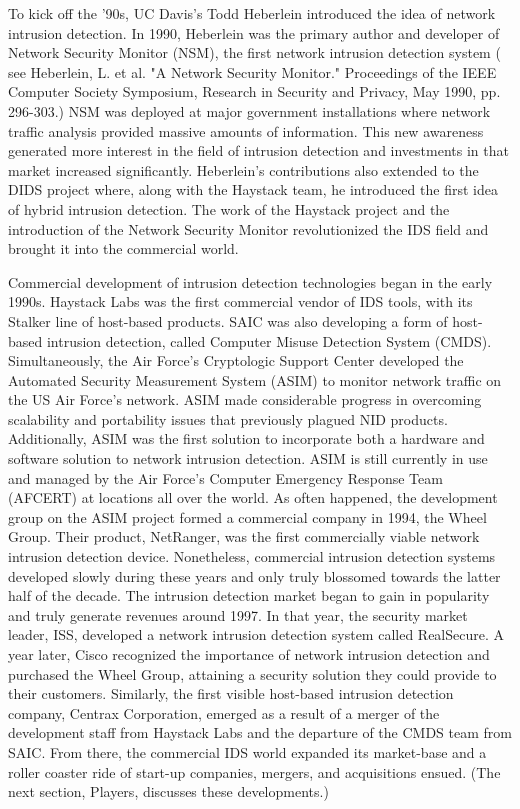 \documentclass[thesis=M,english]{FITthesis}[2011/07/15]
\begin{document}
To kick off the '90s, UC Davis's Todd Heberlein introduced the idea of network intrusion detection. In 1990, Heberlein was the primary author and developer of Network Security Monitor (NSM), the first network intrusion detection system ( see Heberlein, L. et al. "A Network Security Monitor." Proceedings of the IEEE Computer Society Symposium, Research in Security and Privacy, May 1990, pp. 296-303.) NSM was deployed at major government installations where network traffic analysis provided massive amounts of information. This new awareness generated more interest in the field of intrusion detection and investments in that market increased significantly. Heberlein's contributions also extended to the DIDS project where, along with the Haystack team, he introduced the first idea of hybrid intrusion detection. The work of the Haystack project and the introduction of the Network Security Monitor revolutionized the IDS field and brought it into the commercial world.

Commercial development of intrusion detection technologies began in the early 1990s. Haystack Labs was the first commercial vendor of IDS tools, with its Stalker line of host-based products. SAIC was also developing a form of host-based intrusion detection, called Computer Misuse Detection System (CMDS). Simultaneously, the Air Force's Cryptologic Support Center developed the Automated Security Measurement System (ASIM) to monitor network traffic on the US Air Force's network. ASIM made considerable progress in overcoming scalability and portability issues that previously plagued NID products. Additionally, ASIM was the first solution to incorporate both a hardware and software solution to network intrusion detection. ASIM is still currently in use and managed by the Air Force's Computer Emergency Response Team (AFCERT) at locations all over the world. As often happened, the development group on the ASIM project formed a commercial company in 1994, the Wheel Group. Their product, NetRanger, was the first commercially viable network intrusion detection device. Nonetheless, commercial intrusion detection systems developed slowly during these years and only truly blossomed towards the latter half of the decade.
The intrusion detection market began to gain in popularity and truly generate revenues around 1997. In that year, the security market leader, ISS, developed a network intrusion detection system called RealSecure. A year later, Cisco recognized the importance of network intrusion detection and purchased the Wheel Group, attaining a security solution they could provide to their customers. Similarly, the first visible host-based intrusion detection company, Centrax Corporation, emerged as a result of a merger of the development staff from Haystack Labs and the departure of the CMDS team from SAIC. From there, the commercial IDS world expanded its market-base and a roller coaster ride of start-up companies, mergers, and acquisitions ensued. (The next section, Players, discusses these developments.)
\end{document}
